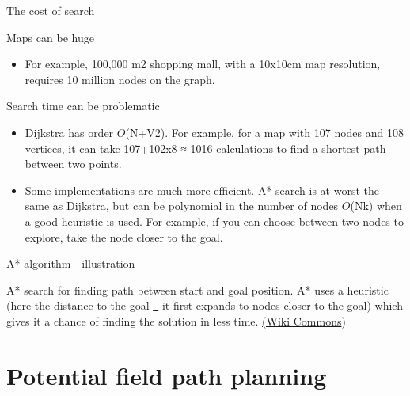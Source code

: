 \documentclass[compress]{beamer}
\begin{document}
\begin{frame}{The cost of search}

Maps can be huge

\begin{itemize}
\item For example, 100,000 m2 shopping mall, with a 10x10cm map
  resolution, requires 10 million nodes on the graph.
\end{itemize}

Search time can be problematic

\begin{itemize}
\item Dijkstra has order $O$(N+V2). For example, for a map with 107
  nodes and 108 vertices, it can take 107+102x8 ≈ 1016 calculations to
  find a shortest path between two points.
\item Some implementations are much more efficient. A* search is at worst
  the same as Dijkstra, but can be polynomial in the number of nodes
  $O$(Nk) when a good heuristic is used. For example, if you can
  choose between two nodes to explore, take the node closer to the goal.
\end{itemize}

\end{frame}

\begin{frame}{A* algorithm - illustration}

    \begin{center}
    \end{center}

A* search for finding path between start and goal position. A* uses a
heuristic (here the distance to the goal
\href{http://en.wikipedia.org/wiki/A*_search_algorithm}{--} it first
expands to nodes closer to the goal) which gives it a chance of finding
the solution in less time.
\href{http://en.wikipedia.org/wiki/A*_search_algorithm}{(Wiki Commons})

\end{frame}

\section{Potential field path planning}
\end{document}
